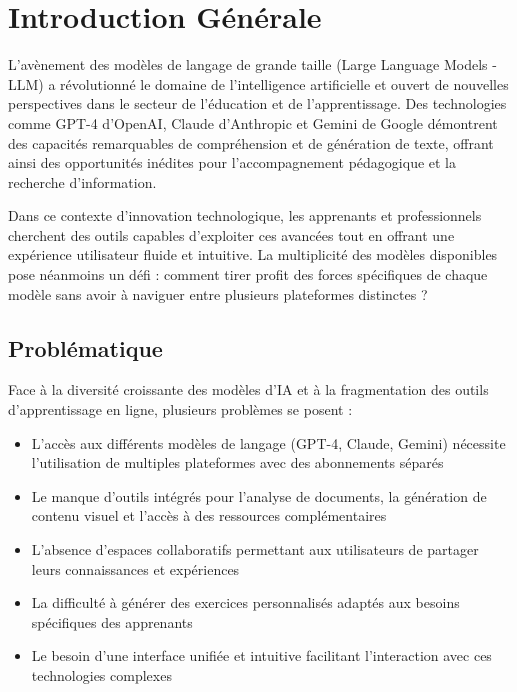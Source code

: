 

\chapter*{Introduction Générale}
%
%

\vspace{1cm}

L'avènement des modèles de langage de grande taille (Large Language Models - LLM) a révolutionné le domaine de l'intelligence artificielle et ouvert de nouvelles perspectives dans le secteur de l'éducation et de l'apprentissage. Des technologies comme GPT-4 d'OpenAI, Claude d'Anthropic et Gemini de Google démontrent des capacités remarquables de compréhension et de génération de texte, offrant ainsi des opportunités inédites pour l'accompagnement pédagogique et la recherche d'information.

Dans ce contexte d'innovation technologique, les apprenants et professionnels cherchent des outils capables d'exploiter ces avancées tout en offrant une expérience utilisateur fluide et intuitive. La multiplicité des modèles disponibles pose néanmoins un défi : comment tirer profit des forces spécifiques de chaque modèle sans avoir à naviguer entre plusieurs plateformes distinctes ?

\section*{Problématique}

Face à la diversité croissante des modèles d'IA et à la fragmentation des outils d'apprentissage en ligne, plusieurs problèmes se posent :

\begin{itemize}
    \item L'accès aux différents modèles de langage (GPT-4, Claude, Gemini) nécessite l'utilisation de multiples plateformes avec des abonnements séparés
    \item Le manque d'outils intégrés pour l'analyse de documents, la génération de contenu visuel et l'accès à des ressources complémentaires
    \item L'absence d'espaces collaboratifs permettant aux utilisateurs de partager leurs connaissances et expériences
    \item La difficulté à générer des exercices personnalisés adaptés aux besoins spécifiques des apprenants
    \item Le besoin d'une interface unifiée et intuitive facilitant l'interaction avec ces technologies complexes
\end{itemize}

